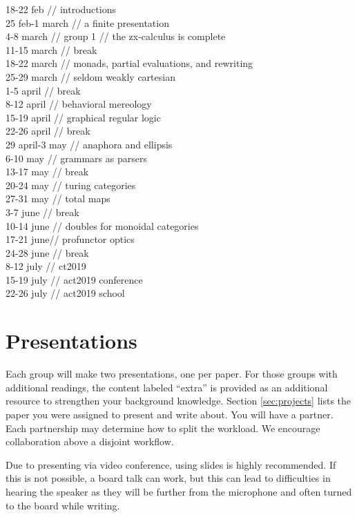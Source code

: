 \documentclass[11pt, oneside]{article}
\begin{document}
18-22 feb // introductions \\
25 feb-1 march //  a finite presentation \\
4-8 march // group 1 // the zx-calculus is complete \\
11-15 march // break \\
18-22 march // monads, partial evaluations, and rewriting \\
25-29 march // seldom weakly cartesian \\
1-5 april // break \\
8-12 april // behavioral mereology \\
15-19 april // graphical regular logic \\
22-26 april // break \\
29 april-3 may // anaphora and ellipsis \\
6-10 may // grammars as parsers \\
13-17 may // break \\
20-24 may  // turing categories \\
27-31 may  // total maps \\
3-7 june // break \\
10-14 june // doubles for monoidal categories \\
17-21 june// profunctor optics \\
24-28 june // break \\
8-12 july // ct2019 \\
15-19 july // act2019 conference \\
22-26 july // act2019 school \\

\pagebreak

\section{Presentations}
\label{sec:presentations}

Each group will make two presentations, one per paper.  For
those groups with additional readings, the content labeled
``extra'' is provided as an additional resource to
strengthen your background knowledge. Section
\ref{sec:projects} lists the paper you were assigned to
present and write about. You will have a partner.  Each
partnership may determine how to split the workload. We
encourage collaboration above a disjoint workflow.  

Due to presenting via video conference, using slides is
highly recommended. If this is not possible, a board talk
can work, but this can lead to difficulties in hearing the
speaker as they will be further from the microphone and
often turned to the board while writing.  
\end{document}

